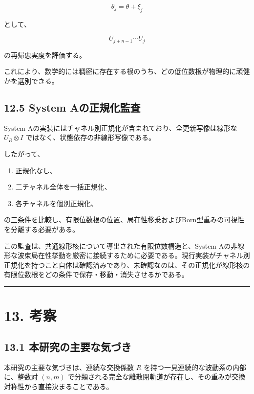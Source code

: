 \documentclass[
  a4paper,
  10pt]{article}
\providecommand{\tightlist}{%
  \setlength{\itemsep}{0pt}\setlength{\parskip}{0pt}}
\begin{document}
\[
\theta_j=\theta+\xi_j
\]

として、

\[
U_{j+n-1}\cdots U_j
\]

の再帰忠実度を評価する。

これにより、数学的には稠密に存在する根のうち、どの低位数根が物理的に頑健かを選別できる。

\subsection{12.5 System
Aの正規化監査}\label{125-system-aux306eux6b63ux898fux5316ux76e3ux67fb}

System Aの実装にはチャネル別正規化が含まれており、全更新写像は線形な
\(U_R\otimes I\) ではなく、状態依存の非線形写像である。

したがって、

\begin{enumerate}
\def\labelenumi{\arabic{enumi}.}
\tightlist
\item
  正規化なし、
\item
  二チャネル全体を一括正規化、
\item
  各チャネルを個別正規化、
\end{enumerate}

の三条件を比較し、有限位数根の位置、局在性移乗およびBorn型重みの可視性を分離する必要がある。

この監査は、共通線形核について導出された有限位数構造と、System
Aの非線形な波束局在性挙動を厳密に接続するために必要である。現行実装がチャネル別正規化を持つこと自体は確認済みであり、未確認なのは、その正規化が線形核の有限位数根をどの条件で保存・移動・消失させるかである。

\begin{center}\rule{0.5\linewidth}{0.5pt}\end{center}

\section{13. 考察}\label{13-ux8003ux5bdf}

\subsection{13.1
本研究の主要な気づき}\label{131-ux672cux7814ux7a76ux306eux4e3bux8981ux306aux6c17ux3065ux304d}

本研究の主要な気づきは、連続な交換係数 \(R\)
を持つ一見連続的な波動系の内部に、整数対 \((n,m)\)
で分類される完全な離散閉軌道が存在し、その重みが交換対称性から直接決まることである。
\end{document}

